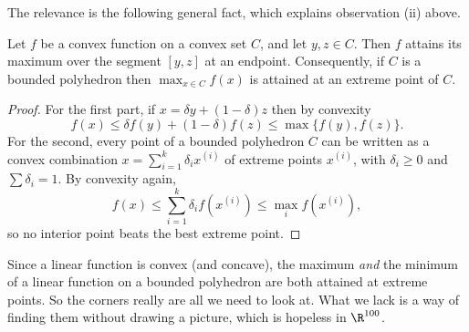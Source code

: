 \documentclass[a4paper]{scrartcl}
\begin{document}
\begin{center}
\end{center}

The relevance is the following general fact, which explains observation (ii) above.

\begin{proposition}
    Let $f$ be a convex function on a convex set $C$, and let $y, z \in C$. Then $f$ attains its maximum over the segment $[y,z]$ at an endpoint. Consequently, if $C$ is a bounded polyhedron then $\max_{x \in C}f(x)$ is attained at an extreme point of $C$.
\end{proposition}
\begin{proof}
    For the first part, if $x = \delta y + (1-\delta)z$ then by convexity
    $$
    f(x) \leq \delta f(y) + (1 - \delta)f(z) \leq \max\{f(y), f(z)\}.
    $$
    For the second, every point of a bounded polyhedron $C$ can be written as a convex combination $x = \sum_{i=1}^k \delta_i x^{(i)}$ of extreme points $x^{(i)}$, with $\delta_i \geq 0$ and $\sum\delta_i = 1$. By convexity again,
    $$
    f(x) \leq \sum_{i = 1}^k \delta_i f(x^{(i)}) \leq \max_i f(x^{(i)}),
    $$
    so no interior point beats the best extreme point.
\end{proof}

Since a linear function is convex (and concave), the maximum \emph{and} the minimum of a linear function on a bounded polyhedron are both attained at extreme points. So the corners really are all we need to look at. What we lack is a way of finding them without drawing a picture, which is hopeless in $\R^{100}$.
\end{document}
